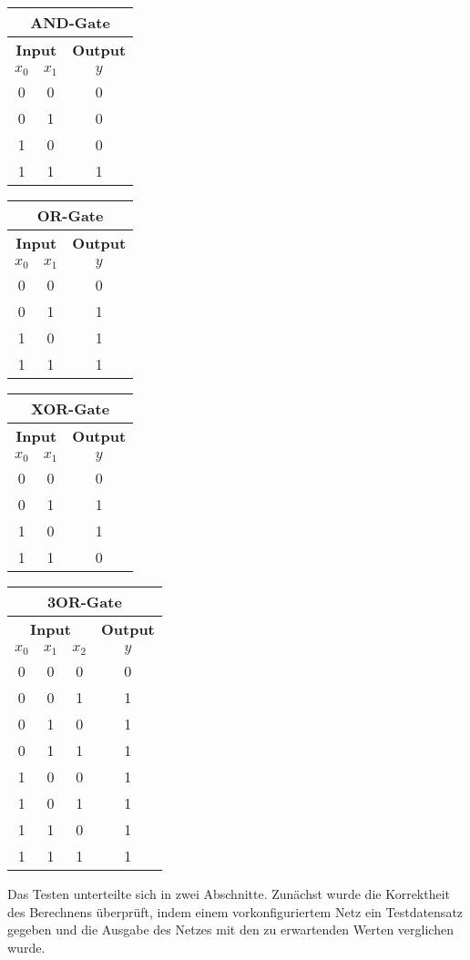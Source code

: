 \documentclass[paper=A4,pagesize=auto,12pt,headinclude=true,footinclude=true,BCOR=0mm,DIV=calc]{scrartcl}
\begin{document}
\begin{center}
\begin{tabular}{|c|c|c|}
	\hline
	\multicolumn{3}{|c|}{\textbf{AND-Gate}} \\ \hline
	\hline
	\multicolumn{2}{|c|}{\textbf{Input}} & \textbf{Output} \\ \hline
	$x_0$ & $x_1$ & $y$ \\
	\hline\hline
	0 & 0 & 0 \\ \hline
	0 & 1 & 0 \\ \hline
	1 & 0 & 0 \\ \hline
	1 & 1 & 1 \\ \hline
\end{tabular}
\begin{tabular}{|c|c|c|}
	\hline
	\multicolumn{3}{|c|}{\textbf{OR-Gate}} \\ \hline
	\hline
	\multicolumn{2}{|c|}{\textbf{Input}} & \textbf{Output} \\ \hline
	$x_0$ & $x_1$ & $y$ \\
	\hline\hline
	0 & 0 & 0 \\ \hline
	0 & 1 & 1 \\ \hline
	1 & 0 & 1 \\ \hline
	1 & 1 & 1 \\ \hline
\end{tabular}
\begin{tabular}{|c|c|c|}
	\hline
	\multicolumn{3}{|c|}{\textbf{XOR-Gate}} \\ \hline
	\hline
	\multicolumn{2}{|c|}{\textbf{Input}} & \textbf{Output} \\ \hline
	$x_0$ & $x_1$ & $y$ \\
	\hline\hline
	0 & 0 & 0 \\ \hline
	0 & 1 & 1 \\ \hline
	1 & 0 & 1 \\ \hline
	1 & 1 & 0 \\ \hline
\end{tabular}
\begin{tabular}{|c|c|c|c|}
	\hline
	\multicolumn{4}{|c|}{\textbf{3OR-Gate}} \\ \hline
	\hline
	\multicolumn{3}{|c|}{\textbf{Input}} & \textbf{Output} \\ \hline
	$x_0$ & $x_1$ & $x_2$ & $y$ \\
	\hline\hline
	0 & 0 & 0 & 0 \\ \hline
	0 & 0 & 1 & 1 \\ \hline
	0 & 1 & 0 & 1 \\ \hline
	0 & 1 & 1 & 1 \\ \hline
	1 & 0 & 0 & 1 \\ \hline
	1 & 0 & 1 & 1 \\ \hline
	1 & 1 & 0 & 1 \\ \hline
	1 & 1 & 1 & 1 \\ \hline
\end{tabular}
\end{center}
Das Testen unterteilte sich in zwei Abschnitte. Zunächst wurde die Korrektheit des Berechnens überprüft, indem einem vorkonfiguriertem Netz ein Testdatensatz gegeben und die Ausgabe des Netzes mit den zu erwartenden Werten verglichen wurde.
\end{document}
